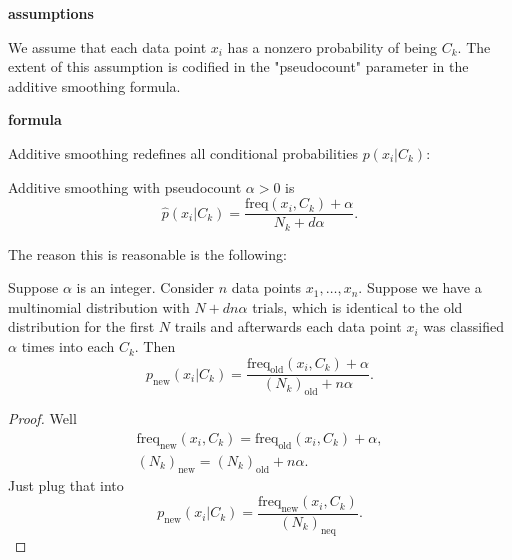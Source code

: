\documentclass[12pt]{article}
\begin{document}
\textbf{assumptions}

We assume that each data point $x_i$ has a nonzero probability of being $C_k$. The extent of this assumption is codified in the "pseudocount" parameter in the additive smoothing formula.

\textbf{formula}

Additive smoothing redefines all conditional probabilities $p(x_i|C_k)$:

\begin{definition}
	Additive smoothing with pseudocount $\alpha>0$ is 
	\begin{equation*}
		\hat{p}(x_i | C_k) = \frac{\text{freq}(x_i,C_k)+\alpha}{N_k + d\alpha}.
	\end{equation*}
\end{definition}

The reason this is reasonable is the following:

\begin{proposition}
	Suppose $\alpha$ is an integer. Consider $n$ data points $x_1,\dots,x_n$. Suppose we have a multinomial distribution with $N+dn\alpha$ trials, which is identical to the old distribution for the first $N$ trails and afterwards each data point $x_i$ was classified $\alpha$ times into each $C_k$. Then 
	\begin{equation*}
		p_{\text{new}}(x_i|C_k) = \frac{\text{freq}_{\text{old}}(x_i,C_k) + \alpha}{(N_k)_{\text{old}} + n\alpha}.
	\end{equation*}
\end{proposition}
\begin{proof}
	Well 
	\begin{gather*}
		\text{freq}_{\text{new}}(x_i, C_k) = \text{freq}_{\text{old}}(x_i, C_k) + \alpha, \\
		(N_k)_{\text{new}} = (N_k)_{\text{old}}+n\alpha.
	\end{gather*}
	Just plug that into 
	\begin{equation*}
		p_{\text{new}}(x_i|C_k) = \frac{\text{freq}_{\text{new}}(x_i,C_k)}{(N_k)_{\text{neq}}}.
	\end{equation*}
\end{proof}


\end{document}
